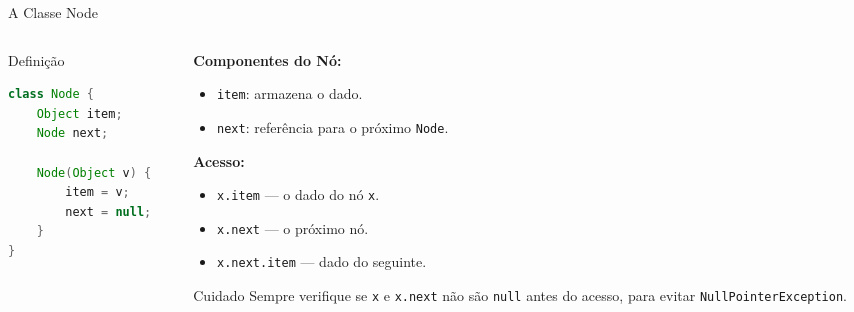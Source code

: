 \documentclass[aspectratio=169]{beamer}
\begin{document}
\begin{frame}[fragile]{A Classe Node}
    \begin{columns}[T]
        \begin{column}{0.45\textwidth}
            \begin{block}{Definição}
                \begin{lstlisting}[language=Java, basicstyle=\ttfamily\small, keywordstyle=\color{blue}]
class Node {
    Object item;
    Node next;

    Node(Object v) {
        item = v;
        next = null;
    }
}
                \end{lstlisting}
            \end{block}
        \end{column}
        \begin{column}{0.53\textwidth}
            \textbf{Componentes do Nó:}
            \begin{itemize}
                \item \texttt{item}: armazena o dado.
                \item \texttt{next}: referência para o próximo \texttt{Node}.
            \end{itemize}
            \vspace{0.3cm}
            \textbf{Acesso:}
            \begin{itemize}
                \item \texttt{x.item} --- o dado do nó \texttt{x}.
                \item \texttt{x.next} --- o próximo nó.
                \item \texttt{x.next.item} --- dado do seguinte.
            \end{itemize}
            \vspace{0.2cm}
            \begin{alertblock}{\small Cuidado}
                \scriptsize Sempre verifique se \texttt{x} e \texttt{x.next} não são \texttt{null} antes do acesso, para evitar \texttt{NullPointerException}.
            \end{alertblock}
        \end{column}
    \end{columns}
\end{frame}
\end{document}

